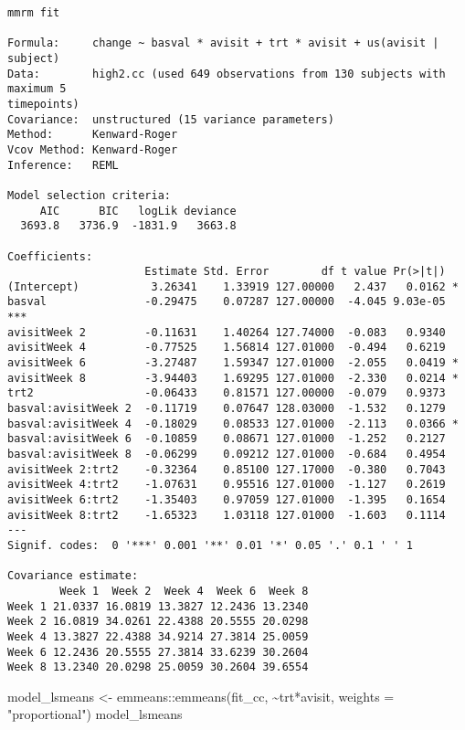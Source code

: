 \documentclass[
  letterpaper,
  DIV=11,
  numbers=noendperiod]{scrreprt}
\newenvironment{Shaded}{\begin{snugshade}}{\end{snugshade}}
\newcommand{\AttributeTok}[1]{\textcolor[rgb]{0.40,0.45,0.13}{#1}}
\newcommand{\FunctionTok}[1]{\textcolor[rgb]{0.28,0.35,0.67}{#1}}
\newcommand{\NormalTok}[1]{\textcolor[rgb]{0.00,0.23,0.31}{#1}}
\newcommand{\OtherTok}[1]{\textcolor[rgb]{0.00,0.23,0.31}{#1}}
\newcommand{\SpecialCharTok}[1]{\textcolor[rgb]{0.37,0.37,0.37}{#1}}
\newcommand{\StringTok}[1]{\textcolor[rgb]{0.13,0.47,0.30}{#1}}
\begin{document}
\begin{verbatim}
mmrm fit

Formula:     change ~ basval * avisit + trt * avisit + us(avisit | subject)
Data:        high2.cc (used 649 observations from 130 subjects with maximum 5 
timepoints)
Covariance:  unstructured (15 variance parameters)
Method:      Kenward-Roger
Vcov Method: Kenward-Roger
Inference:   REML

Model selection criteria:
     AIC      BIC   logLik deviance 
  3693.8   3736.9  -1831.9   3663.8 

Coefficients: 
                     Estimate Std. Error        df t value Pr(>|t|)    
(Intercept)           3.26341    1.33919 127.00000   2.437   0.0162 *  
basval               -0.29475    0.07287 127.00000  -4.045 9.03e-05 ***
avisitWeek 2         -0.11631    1.40264 127.74000  -0.083   0.9340    
avisitWeek 4         -0.77525    1.56814 127.01000  -0.494   0.6219    
avisitWeek 6         -3.27487    1.59347 127.01000  -2.055   0.0419 *  
avisitWeek 8         -3.94403    1.69295 127.01000  -2.330   0.0214 *  
trt2                 -0.06433    0.81571 127.00000  -0.079   0.9373    
basval:avisitWeek 2  -0.11719    0.07647 128.03000  -1.532   0.1279    
basval:avisitWeek 4  -0.18029    0.08533 127.01000  -2.113   0.0366 *  
basval:avisitWeek 6  -0.10859    0.08671 127.01000  -1.252   0.2127    
basval:avisitWeek 8  -0.06299    0.09212 127.01000  -0.684   0.4954    
avisitWeek 2:trt2    -0.32364    0.85100 127.17000  -0.380   0.7043    
avisitWeek 4:trt2    -1.07631    0.95516 127.01000  -1.127   0.2619    
avisitWeek 6:trt2    -1.35403    0.97059 127.01000  -1.395   0.1654    
avisitWeek 8:trt2    -1.65323    1.03118 127.01000  -1.603   0.1114    
---
Signif. codes:  0 '***' 0.001 '**' 0.01 '*' 0.05 '.' 0.1 ' ' 1

Covariance estimate:
        Week 1  Week 2  Week 4  Week 6  Week 8
Week 1 21.0337 16.0819 13.3827 12.2436 13.2340
Week 2 16.0819 34.0261 22.4388 20.5555 20.0298
Week 4 13.3827 22.4388 34.9214 27.3814 25.0059
Week 6 12.2436 20.5555 27.3814 33.6239 30.2604
Week 8 13.2340 20.0298 25.0059 30.2604 39.6554
\end{verbatim}

\begin{Shaded}
\begin{Highlighting}[]
\NormalTok{model\_lsmeans }\OtherTok{\textless{}{-}}\NormalTok{ emmeans}\SpecialCharTok{::}\FunctionTok{emmeans}\NormalTok{(fit\_cc, }\SpecialCharTok{\textasciitilde{}}\NormalTok{trt}\SpecialCharTok{*}\NormalTok{avisit, }\AttributeTok{weights =} \StringTok{"proportional"}\NormalTok{)}
\NormalTok{model\_lsmeans}
\end{Highlighting}
\end{Shaded}
\end{document}
